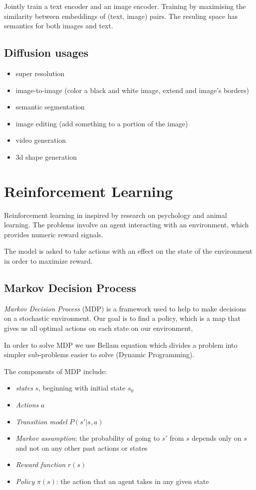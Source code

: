\documentclass[11pt]{article}
\begin{document}
Jointly train a text encoder and an image encoder. Training by
maximising the similarity between embeddings of (text, image) pairs. The
resuling space has semantics for both images and text.

\subsection{Diffusion usages}\label{diffusion-usages}

\begin{itemize}
\tightlist
\item
  super resolution
\item
  image-to-image (color a black and white image, extend and image's
  borders)
\item
  semantic segmentation
\item
  image editing (add something to a portion of the image)
\item
  video generation
\item
  3d shape generation
\end{itemize}

\section{Reinforcement Learning}\label{reinforcement-learning-1}

Reinforcement learning in inspired by research on psychology and animal
learning. The problems involve an agent interacting with an environment,
which provides numeric reward signals.

The model is asked to take actions with an effect on the state of the
environment in order to maximize reward.

\subsection{Markov Decision Process}\label{markov-decision-process}

\emph{Markov Decision Process} (MDP) is a framework used to help to make
decisions on a stochastic environment. Our goal is to find a policy,
which is a map that gives us all optimal actions on each state on our
environment,

In order to solve MDP we use Bellam equation which divides a problem
into simpler sub-problems easier to solve (Dynamic Programming).

The components of MDP include:

\begin{itemize}
\tightlist
\item
  \emph{states} \(s\), beginning with initial state \(s_0\)
\item
  \emph{Actions} \(a\)
\item
  \emph{Transition model} \(P(s'|s, a)\)
\item
  \emph{Markov assumption}: the probability of going to \(s'\) from
  \(s\) depends only on \(s\) and not on any other past actions or
  states
\item
  \emph{Reward function} \(r(s)\)
\item
  \emph{Policy} \(\pi(s)\): the action that an agent takes in any given
  state
\end{itemize}
\end{document}
